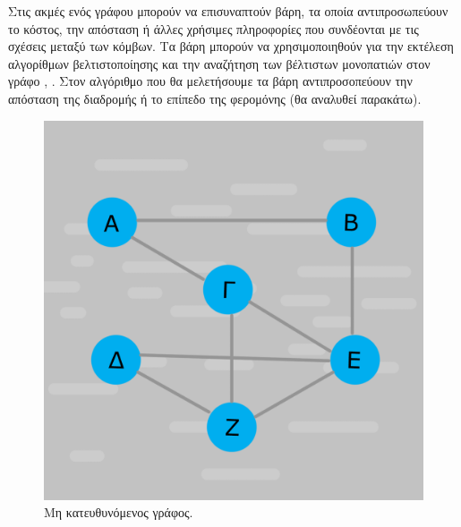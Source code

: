 Στις ακμές ενός γράφου μπορούν να επισυναπτούν βάρη, τα οποία αντιπροσωπεύουν το κόστος, την απόσταση ή άλλες χρήσιμες πληροφορίες που συνδέονται με τις σχέσεις μεταξύ των κόμβων. Τα βάρη μπορούν να χρησιμοποιηθούν για την εκτέλεση αλγορίθμων βελτιστοποίησης και την αναζήτηση των βέλτιστων μονοπατιών στον γράφο \cite{Ντενισιώτης}, \cite{Γκέρτσης}. Στον αλγόριθμο που θα μελετήσουμε τα βάρη αντιπροσοπεύουν την απόσταση της διαδρομής ή το επίπεδο της φερομόνης (θα αναλυθεί παρακάτω). 
\begin{figure}[h]
    \begin{minipage}[c]{.46\linewidth}
        \centering
        \includegraphics[scale=0.15]{2947_thesis/pictures/undirected.png}
        \caption{Μη κατευθυνόμενος γράφος.}
    \end{minipage}
    \hfill%
    \begin{minipage}[c]{.46\linewidth}
        \centering

\end{minipage}
\end{figure}
